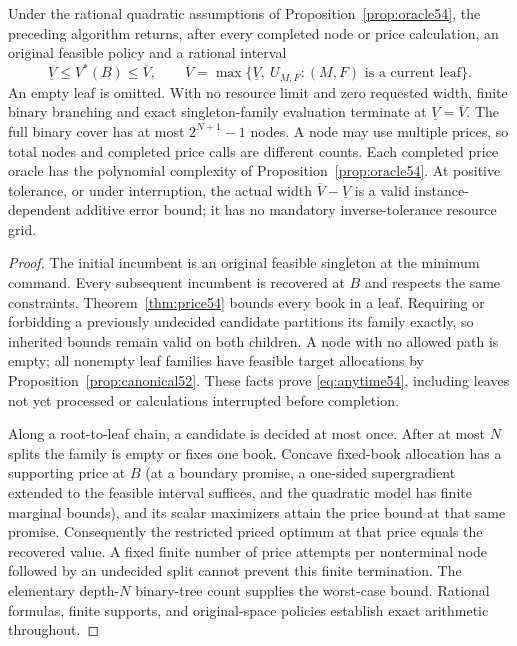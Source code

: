 \begin{theorem}\label{thm:branch54}
Under the rational quadratic assumptions of Proposition~\ref{prop:oracle54}, the preceding algorithm returns, after every completed node or price calculation, an original feasible policy and a rational interval
\begin{equation}\label{eq:anytime54}
 \underline V\leq V^*(B)\leq\overline V,
 \qquad
 \overline V=\max\{\underline V,\ U_{M,F}: (M,F)\text{ is a current leaf}\}.
\end{equation}
An empty leaf is omitted. With no resource limit and zero requested width, finite binary branching and exact singleton-family evaluation terminate at $\underline V=\overline V$. The full binary cover has at most $2^{N+1}-1$ nodes. A node may use multiple prices, so total nodes and completed price calls are different counts. Each completed price oracle has the polynomial complexity of Proposition~\ref{prop:oracle54}. At positive tolerance, or under interruption, the actual width $\overline V-\underline V$ is a valid instance-dependent additive error bound; it has no mandatory inverse-tolerance resource grid.
\end{theorem}
\begin{proof}
The initial incumbent is an original feasible singleton at the minimum command. Every subsequent incumbent is recovered at $B$ and respects the same constraints. Theorem~\ref{thm:price54} bounds every book in a leaf. Requiring or forbidding a previously undecided candidate partitions its family exactly, so inherited bounds remain valid on both children. A node with no allowed path is empty; all nonempty leaf families have feasible target allocations by Proposition~\ref{prop:canonical52}. These facts prove \eqref{eq:anytime54}, including leaves not yet processed or calculations interrupted before completion.

Along a root-to-leaf chain, a candidate is decided at most once. After at most $N$ splits the family is empty or fixes one book. Concave fixed-book allocation has a supporting price at $B$ (at a boundary promise, a one-sided supergradient extended to the feasible interval suffices, and the quadratic model has finite marginal bounds), and its scalar maximizers attain the price bound at that same promise. Consequently the restricted priced optimum at that price equals the recovered value. A fixed finite number of price attempts per nonterminal node followed by an undecided split cannot prevent this finite termination. The elementary depth-$N$ binary-tree count supplies the worst-case bound. Rational formulas, finite supports, and original-space policies establish exact arithmetic throughout.
\end{proof}

